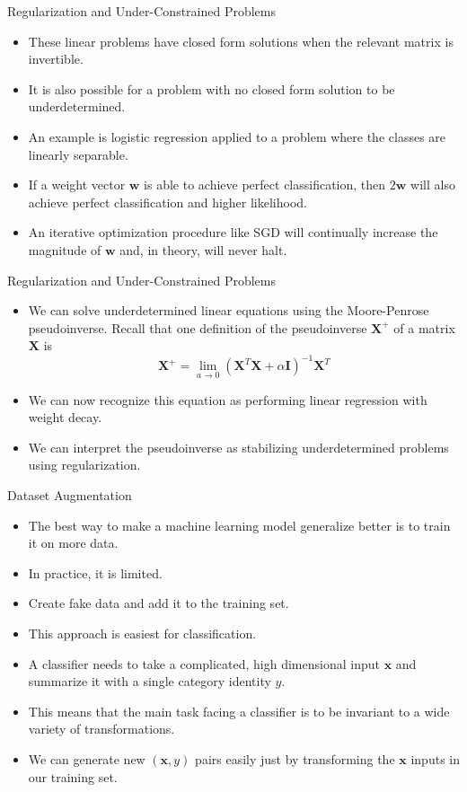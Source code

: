 \documentclass[10pt]{beamer}
\begin{document}
	\begin{frame}{Regularization and Under-Constrained Problems}
		\begin{itemize}
			\item These linear problems have closed form solutions when the relevant matrix is invertible. 
			\pause
			\item It is also possible for a problem with no closed form solution to be underdetermined.
			\pause
			\item An example is logistic regression applied to a problem where the classes are linearly separable.
			\pause
			\item If a weight vector $\bm{w}$ is able to achieve perfect classification, then $2\bm{w}$ will also achieve perfect classification and higher likelihood.
			\pause
			\item An iterative optimization procedure like SGD will continually increase the magnitude of $\bm{w}$ and, in theory, will never halt.
		\end{itemize}
	\end{frame}
	
	\begin{frame}{Regularization and Under-Constrained Problems}
		\begin{itemize}
			\item We can solve underdetermined linear equations using the Moore-Penrose pseudoinverse. Recall that one definition of the pseudoinverse $\bm{X}^+$ of a matrix $\bm{X}$ is
			$$\bm{X^+}=\lim_{a\rightarrow0}(\bm{X}^T\bm{X}+\alpha\bm{I})^{-1}\bm{X}^T$$
			
			\pause
			\item We can now recognize this equation as performing linear regression with weight decay.
			\pause
			\item We can interpret the pseudoinverse as stabilizing underdetermined problems using regularization.
		\end{itemize}
	\end{frame}

	\begin{frame}{Dataset Augmentation}
		\begin{itemize}
			\item The best way to make a machine learning model generalize better is to train it on more data.
			\pause
			\item In practice, it is limited.
			\pause
			\item Create fake data and add it to the training set.
			\pause
			\item This approach is easiest for classification.
			\pause
			\item A classifier needs to take a complicated, high dimensional input $\bm{x}$ and summarize it with a single category identity $y$.
			\pause
			\item This means that the main task facing a classifier is to be invariant to a wide variety of transformations.
			\pause
			\item We can generate new $(\bm{x},y)$ pairs easily just by transforming the $\bm{x}$ inputs in our training set.
		\end{itemize}
	\end{frame}
\end{document}
